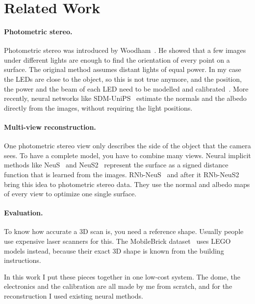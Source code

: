 \documentclass[10pt,twocolumn]{article}
\begin{document}
\section{Related Work}
\paragraph{Photometric stereo.} Photometric stereo was introduced by Woodham~\cite{woodham1980}. He showed that a few images under different lights are enough to find the orientation of every point on a surface. The original method assumes distant lights of equal power. In my case the LEDs are close to the object, so this is not true anymore, and the position, the power and the beam of each LED need to be modelled and calibrated~\cite{queau2018}. More recently, neural networks like SDM-UniPS~\cite{ikehata2023} estimate the normals and the albedo directly from the images, without requiring the light positions.

\paragraph{Multi-view reconstruction.} One photometric stereo view only describes the side of the object that the camera sees. To have a complete model, you have to combine many views. Neural implicit methods like NeuS~\cite{wang2021} and NeuS2~\cite{wang2023} represent the surface as a signed distance function that is learned from the images. RNb-NeuS~\cite{brument2024} and after it RNb-NeuS2~\cite{bruneau2026} bring this idea to photometric stereo data. They use the normal and albedo maps of every view to optimize one single surface.

\paragraph{Evaluation.} To know how accurate a 3D scan is, you need a reference shape. Usually people use expensive laser scanners for this. The MobileBrick dataset~\cite{li2023} uses LEGO models instead, because their exact 3D shape is known from the building instructions.

In this work I put these pieces together in one low-cost system. The dome, the electronics and the calibration are all made by me from scratch, and for the reconstruction I used existing neural methods.
\end{document}
